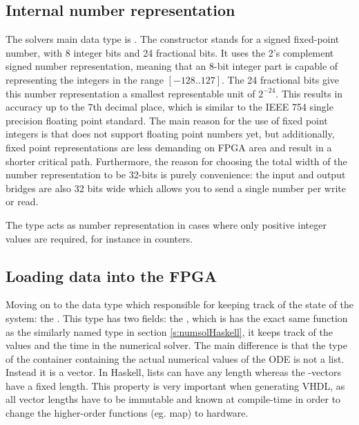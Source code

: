 \subsection{Internal number representation}
The solvers main data type is . The constructor  stands for a signed fixed-point number, with 8 integer bits and 24 fractional bits. It uses the 2's complement signed number representation, meaning that an 8-bit integer part is capable of representing the integers in the range $[-128..127]$. The 24 fractional bits give this number representation a smallest representable unit of $2^{-24}$. This results in accuracy up to the 7th decimal place, which is similar to the IEEE 754 single precision floating point standard. The main reason for the use of fixed point integers is that \clash{} does not support floating point numbers yet, but additionally, fixed point representations are less demanding on FPGA area and result in a shorter critical path. Furthermore, the reason for choosing the total width of the number representation to be 32-bits is purely convenience: the input and output bridges are also 32 bits wide which allows you to send a single number per write or read.

The  type acts as number representation in cases where only positive integer values are required, for instance in counters.



\subsection{Loading data into the FPGA}
Moving on to the data type which responsible for keeping track of the state of the system: the . This type has two fields: the , which is has the exact same function as the similarly named type in section \ref{s:numsolHaskell}, it keeps track of the values and the time in the numerical solver. The main difference is that the type of the container containing the actual numerical values of the ODE is not a list. Instead it is a vector. In Haskell, lists can have any length whereas the \clash{}-vectors have a fixed length. This property is very important when generating VHDL, as all vector lengths have to be immutable and known at compile-time in order to change the higher-order functions (eg. map) to hardware. 

